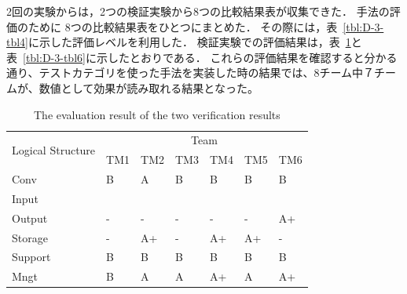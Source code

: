 \documentclass[a4paper,12pt]{jreport}
\begin{document}
2回の実験からは，2つの検証実験から8つの比較結果表が収集できた．
手法の評価のために 8つの比較結果表をひとつにまとめた．
その際には，表~\ref{tbl:D-3-tbl4}に示した評価レベルを利用した． 検証実験での評価結果は，表~\ref{tbl:D-3-tbl5}と表~\ref{tbl:D-3-tbl6}に示したとおりである．
これらの評価結果を確認すると分かる通り、テストカテゴリを使った手法を実装した時の結果では、8チーム中７チームが、数値として効果が読み取れる結果となった。

\begin{table}[htbp]
  \centering
  \caption{The evaluation result of the two verification results}
    \begin{tabular}{|l|l|l|l|l|l|l|}
    \hline
    \multicolumn{1}{|c|}{\multirow{2}[4]{*}{Logical
Structure}} & \multicolumn{6}{c|}{Team} \bigstrut\\
\cline{2-7}          & TM1   & TM2   & TM3   & TM4   & TM5   & TM6 \bigstrut\\
    \hline
    Conv  & B     & A     & B     & B     & B     & B \bigstrut\\
    \hline
    Input &       &       &       &       &       &  \bigstrut\\
    \hline
    Output & -     & -     & -     & -     & -     & A+ \bigstrut\\
    \hline
    Storage & -     & A+    & -     & A+    & A+    & - \bigstrut\\
    \hline
    Support & B     & B     & B     & B     & B     & B \bigstrut[t]\\
    Mngt  & B     & A     & A     & A+    & A     & A+ \bigstrut[b]\\
    \hline
    \end{tabular}%
  \label{tbl:D-3-tbl5}%
\end{table}%
\end{document}
